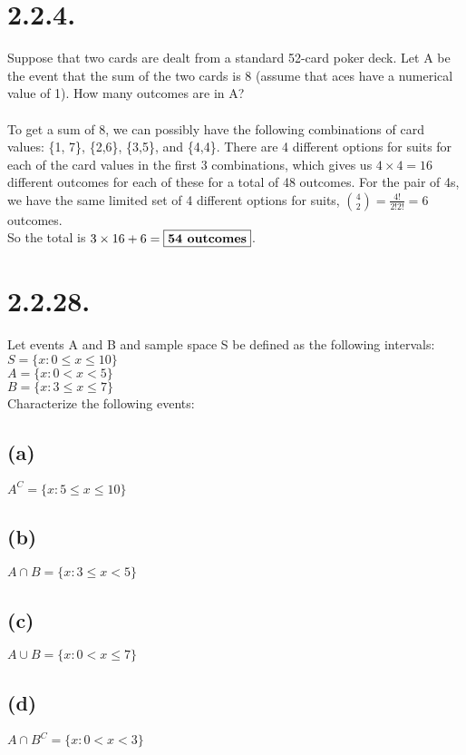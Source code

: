 \documentclass{article}
\begin{document}
\thispagestyle{firstpageheader}
{\Large 
\section*{2.2.4.}
Suppose that two cards are dealt from a standard 52-card poker deck. Let A be the event that the sum of the two cards is 8 (assume that aces have a numerical value of 1). How many outcomes are in A?\@
\\ \\
To get a sum of 8, we can possibly have the following combinations of card values: \{1, 7\}, \{2,6\}, \{3,5\}, and \{4,4\}. There are 4 different options for suits for each of the card values in the first 3 combinations, which gives us \(4 \times 4 = 16\) different outcomes for each of these for a total of 48 outcomes. For the pair of 4s, we have the same limited set of 4 different options for suits, \({4 \choose 2} = \frac{4!}{2!2!} = 6\) outcomes. \\ 
\@
So the total is \(3 \times 16 + 6 = \fbox{\textbf{54 outcomes}}\).

\section*{2.2.28.}
Let events A and B and sample space S be defined as the following intervals: \\
\( S = \{x : 0 \leq x \leq 10\} \) \\ 
\( A = \{ x : 0 < x < 5 \} \) \\ 
\( B = \{ x : 3 \leq x \leq 7 \} \) \\
Characterize the following events:

\subsection*{(a)} 
\(A^C = \{ x : 5 \leq x \leq 10 \} \)

\subsection*{(b)}
\( A \cap B = \{ x : 3 \leq x < 5 \} \)

\subsection*{(c)}
\( A \cup B = \{ x : 0 < x \leq 7 \} \)

\subsection*{(d)}
\( A \cap B^C = \{ x : 0 < x < 3 \} \)

}
\end{document}
